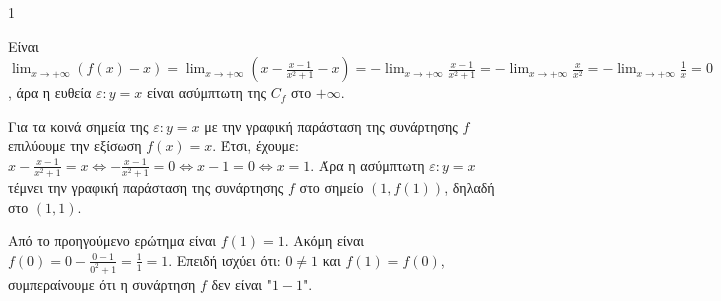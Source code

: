 \begin{ylh}{1}
    \item [Ύλη από εικόνα]
\end{ylh}
\begin{alist}
\item Είναι $\lim_{x\to+\infty} (f(x)-x)=\lim_{x\to+\infty} \left(x-\frac{x-1}{x^2+1}-x\right)=-\lim_{x\to+\infty} \frac{x-1}{x^2+1}=-\lim_{x\to+\infty} \frac{x}{x^2}=-\lim_{x\to+\infty} \frac{1}{x}=0$, άρα η ευθεία $\varepsilon: y=x$ είναι ασύμπτωτη της $C_f$ στο $+\infty$.

\item Για τα κοινά σημεία της $\varepsilon: y=x$ με την γραφική παράσταση της συνάρτησης $f$ επιλύουμε την εξίσωση $f(x)=x$. Έτσι, έχουμε: $x-\frac{x-1}{x^2+1}=x \Leftrightarrow -\frac{x-1}{x^2+1}=0 \Leftrightarrow x-1=0 \Leftrightarrow x=1$.
Άρα η ασύμπτωτη $\varepsilon: y=x$ τέμνει την γραφική παράσταση της συνάρτησης $f$ στο σημείο $(1,f(1))$, δηλαδή στο $(1,1)$.

\item Από το προηγούμενο ερώτημα είναι $f(1)=1$. Ακόμη είναι $f(0)=0-\frac{0-1}{0^2+1}=\frac{1}{1}=1$. Επειδή ισχύει ότι: $0 \ne 1$ και $f(1)=f(0)$, συμπεραίνουμε ότι η συνάρτηση $f$ δεν είναι "$1-1$".
\end{alist}